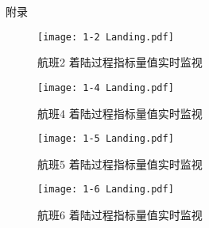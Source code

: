 \documentclass{MathorCupModeling}
\begin{document}
	\newpage


	\begin{center}
		\heiti{} 附\hspace{2pc}录
	\end{center}

	\begin{figure}[H]
		\centering
		\texttt{[image: 1-2 Landing.pdf]}
		\caption{航班2 着陆过程指标量值实时监视}
		\label{fig:1-2}
	\end{figure}
	\begin{figure}[H]
		\centering
		\texttt{[image: 1-4 Landing.pdf]}
		\caption{航班4 着陆过程指标量值实时监视}
		\label{fig:1-4}
	\end{figure}
	\begin{figure}[H]
		\centering
		\texttt{[image: 1-5 Landing.pdf]}
		\caption{航班5 着陆过程指标量值实时监视}
		\label{fig:1-5}
	\end{figure}
	\begin{figure}[H]
		\centering
		\texttt{[image: 1-6 Landing.pdf]}
		\caption{航班6 着陆过程指标量值实时监视}
		\label{fig:1-6}
	\end{figure}
\end{document}

